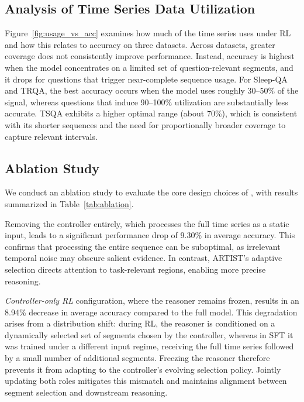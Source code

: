 \subsection{Analysis of Time Series Data Utilization}
Figure~\ref{fig:usage_vs_acc} examines how much of the time series \algoname uses under RL and how this relates to accuracy on three datasets.
Across datasets, greater coverage does not consistently improve performance.
Instead, accuracy is highest when the model concentrates on a limited set of question-relevant segments, and it drops for questions that trigger near-complete sequence usage.
For Sleep-QA and TRQA, the best accuracy occurs when the model uses roughly 30--50\% of the signal, whereas questions that induce 90--100\% utilization are substantially less accurate.
TSQA exhibits a higher optimal range (about 70\%), which is consistent with its shorter sequences and the need for proportionally broader coverage to capture relevant intervals.

\subsection{Ablation Study}
We conduct an ablation study to evaluate the core design choices of \algoname, with results summarized in Table~\ref{tab:ablation}.

Removing the controller entirely, which processes the full time series as a static input, leads to a significant performance drop of 9.30\% in average accuracy. This confirms that processing the entire sequence can be suboptimal, as irrelevant temporal noise may obscure salient evidence. In contrast, ARTIST’s adaptive selection directs attention to task-relevant regions, enabling more precise reasoning.

\emph{Controller-only RL} configuration, where the reasoner remains frozen, results in an 8.94\% decrease in average accuracy compared to the full model. This degradation arises from a distribution shift: during RL, the reasoner is conditioned on a dynamically selected set of segments chosen by the controller, whereas in SFT it was trained under a different input regime, receiving the full time series followed by a small number of additional segments. Freezing the reasoner therefore prevents it from adapting to the controller’s evolving selection policy. Jointly updating both roles mitigates this mismatch and maintains alignment between segment selection and downstream reasoning.

